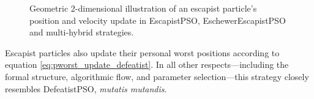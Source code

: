 {\begin{figure}[H]
    \caption[Geometric illustration of escapist particle's position and velocity update]{Geometric 2-dimensional illustration of an escapist particle's position and velocity update in EscapistPSO, EschewerEscapistPSO and multi-hybrid strategies.}
    \label{fig:EscapistPSO_geometric_illustration}
\end{figure}


Escapist particles also update their personal worst positions according to equation \eqref{eq:pworst_update_defeatist}. In all other respects—including the formal structure, algorithmic flow, and parameter selection—this strategy closely resembles DefeatistPSO, \textit{mutatis mutandis}.

}
